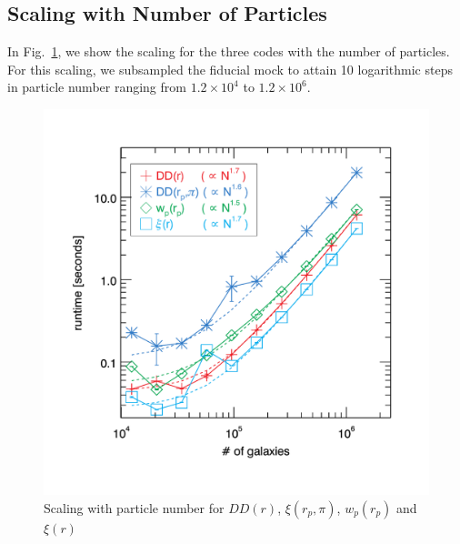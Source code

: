 \documentclass[preprint, 12pt, authoryear]{elsarticle}
\newcommand{\xir}{\ensuremath{{DD(r)}}\xspace}
\newcommand{\xiofr}{\ensuremath{{\xi(r)}}\xspace}
\newcommand{\wprp}{\ensuremath{{w_p(r_p)}}\xspace}
\newcommand{\xirppi}{\ensuremath{{\xi(r_p,\pi)}}\xspace}
\begin{document}
\subsection{Scaling with Number of Particles}
In Fig.~\ref{fig:scaling_numpart}, we show the scaling for the three codes with the number of particles. For this scaling, we subsampled 
the fiducial mock to attain 10 logarithmic steps in particle number ranging from $1.2\times10^4$ to $1.2\times10^6$. 

\begin{figure}[htbp]
\includegraphics[clip=true,width=\linewidth]{timings_Mr19_numpart}%
\caption{Scaling with particle number for \xir, \xirppi, \wprp and \xiofr}
\label{fig:scaling_numpart}
\end{figure}
\end{document}
